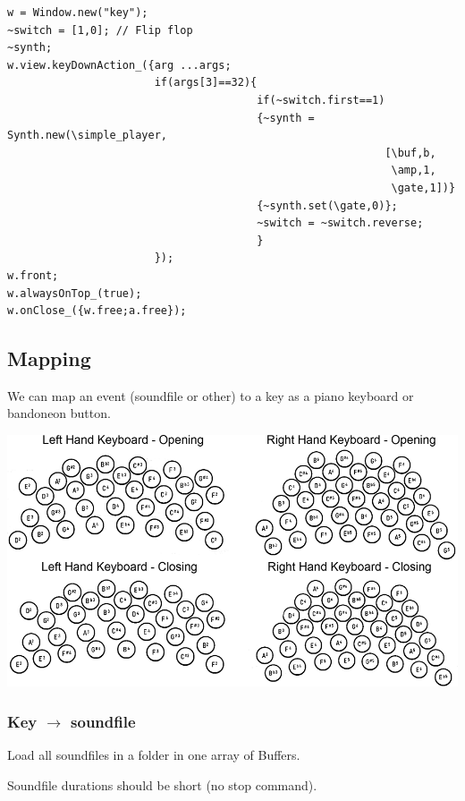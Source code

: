 \begin{enumerate}
\begin{lstlisting}[frame=single, caption=playback one-shot model]
w = Window.new("key");
~switch = [1,0]; // Flip flop
~synth;
w.view.keyDownAction_({arg ...args;
                       if(args[3]==32){
                                       if(~switch.first==1)
                                       {~synth = Synth.new(\simple_player,
                                                           [\buf,b,
                                                            \amp,1,
                                                            \gate,1])}
                                       {~synth.set(\gate,0)};
                                       ~switch = ~switch.reverse;
                                       }
                       });
w.front;
w.alwaysOnTop_(true);
w.onClose_({w.free;a.free});
\end{lstlisting} 

\end{enumerate}
\subsection{Mapping}\label{mapping}

We can map an event (soundfile or other) to a key as a piano keyboard or bandoneon button.

\begin{center}
\includegraphics[scale=0.9]{../img/mapping.png}
\end{center}

\subsubsection{Key \(\rightarrow\) soundfile }\label{key-soundfile}

Load all soundfiles in a folder in one array of Buffers.

Soundfile durations should be short (no stop command).

